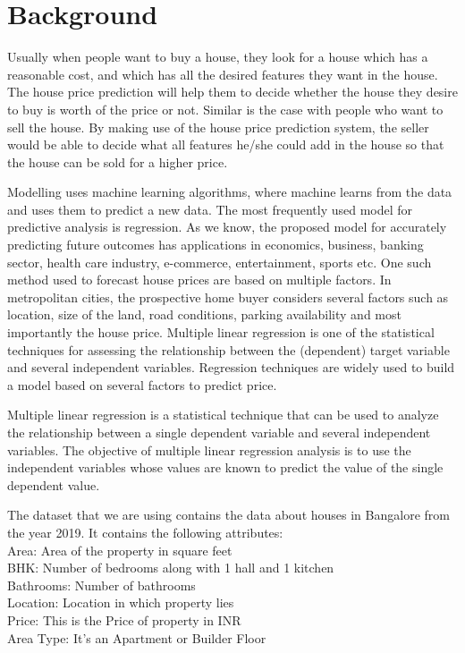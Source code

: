 \section{Background}\label{sec:bkgrnd}%
Usually when people want to buy a house, they look for a house which has a reasonable cost, and which has all the desired features they want in the house. The house price prediction will help them to decide whether the house they desire to buy is worth of the price or not. Similar is the case with people who want to sell the house. By making use of the house price prediction system, the seller would be able to decide what all features he/she could add in the house so that the house can be sold for a higher price. \cite{kaushal2021house}
\par
Modelling uses machine learning algorithms, where machine learns from the data and uses them to predict a new data. The most frequently used model for predictive analysis is regression. As we know, the proposed model for accurately predicting future outcomes has applications in economics, business, banking sector, health care industry, e-commerce, entertainment, sports etc. One such method used to forecast house prices are based on multiple factors. In metropolitan cities, the prospective home buyer considers several factors such as location, size of the land, road conditions, parking availability and most importantly the house price. Multiple linear regression is one of the statistical techniques for assessing the relationship between the (dependent) target variable and several independent variables. Regression techniques are widely used to build a model based on several factors to predict price. \cite{manasa2020machine}
 \par
Multiple linear regression is a statistical technique that can be used to analyze the relationship between a single dependent variable and several independent variables. The objective of multiple linear regression analysis is to use the independent variables whose values are known to predict the value of the single dependent value.
\par
The dataset that we are using contains the data about houses in Bangalore from the year 2019. It contains the following attributes:\\
Area: Area of the property in square feet\\
BHK: Number of bedrooms along with 1 hall and 1 kitchen\\
Bathrooms: Number of bathrooms\\
Location: Location in which property lies\\
Price: This is the Price of property in INR\\
Area Type: It’s an Apartment or Builder Floor

